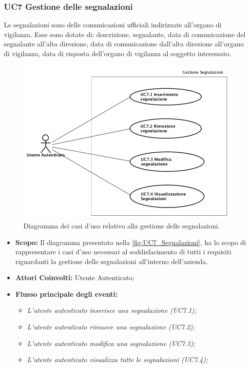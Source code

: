 	\newpage
	\subsubsection{UC7 Gestione delle segnalazioni}
		\label{section:UC7}	
		Le segnalazioni sono delle comunicazioni ufficiali indirizzate all'organo di vigilanza. Esse sono dotate di: descrizione, segnalante, data di comunicazione del segnalante all'alta direzione, data di comunicazione dall'alta direzione all'organo di vigilanza, data di risposta dell'organo di vigilanza al soggetto interessato.\\
		\begin{figure}[H]
			\begin{center}
				\includegraphics[width=12cm]{Pics/UC7Segnalazioni.png}
				\caption{Diagramma dei casi d'uso relativo alla gestione delle segnalazioni.}
				\label{fig:UC7_Segnalazioni}
			\end{center}
		\end{figure}
		
		\begin{itemize}
			\item \textbf{Scopo:} Il diagramma presentato nella \autoref{fig:UC7_Segnalazioni}, ha lo scopo di rappresentare i casi d'uso necessari al soddisfacimento di tutti i requisiti riguardanti la gestione delle segnalazioni all'interno dell'azienda. \\ 
			\item \textbf{Attori Coinvolti:} Utente Autenticato;
			\item \textbf{Flusso principale degli eventi:} 
			\begin{itemize}
				\item \textit{L'utente autenticato inserisce una segnalazione (UC7.1);}
				\item \textit{L'utente autenticato rimuove una segnalazione (UC7.2);}
				\item \textit{L'utente autenticato modifica una segnalazione (UC7.3);}
				\item \textit{L'utente autenticato visualizza tutte le segnalazioni (UC7.4);}
			\end{itemize}
		\end{itemize}
		
